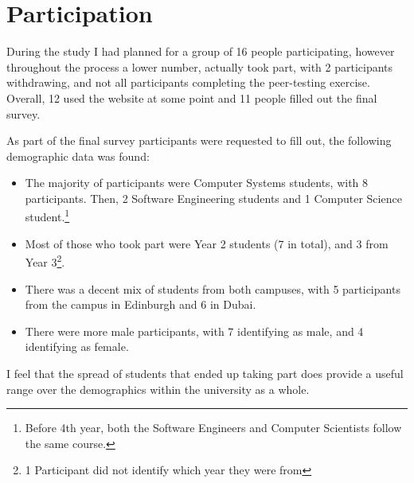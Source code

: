 \documentclass[a4paper,11pt]{report}
\begin{document}
\section{Participation}
During the study I had planned for a group of 16 people participating, however throughout the process a lower number, actually took part, with 2 participants withdrawing, and not all participants completing the peer-testing exercise. Overall, 12 used the website at some point and 11 people filled out the final survey.\par
As part of the final survey participants were requested to fill out, the following demographic data was found:
\begin{itemize}
\item The majority of participants were Computer Systems students, with 8 participants. Then, 2 Software Engineering students and 1 Computer Science student.\footnote{Before 4th year, both the Software Engineers and Computer Scientists follow the same course.}
\item Most of those who took part were Year 2 students (7 in total), and 3 from Year 3\footnote{1 Participant did not identify which year they were from}. 
\item There was a decent mix of students from both campuses, with 5 participants from the campus in Edinburgh and 6 in Dubai.
\item There were more male participants, with 7 identifying as male, and 4 identifying as female.
\end{itemize}
I feel that the spread of students that ended up taking part does provide a useful range over the demographics within the university as a whole.
\end{document}
